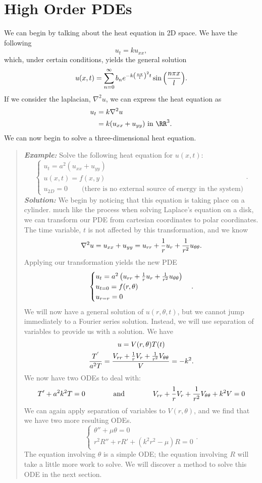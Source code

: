 \section{High Order PDEs}

We can begin by talking about the heat equation in 2D space. We have the following
\[
u_{t}=ku_{xx},
\]
which, under certain conditions, yields the general solution
\[
u(x,t) = \sum_{n=0}^{\infty}b_{n}e^{-k\left({n\pi\over l}\right)^{2}t}\sin{\left({n\pi x\over l}\right)}.
\]
If we consider the laplacian, $\nabla^{2}u$, we can express the heat equation as
\begin{align*}
u_{t}&=k\nabla^{2}u\\
&=k(u_{xx} + u_{yy})\text{ in }\RR^{3}.
\end{align*}
We can now begin to solve a three-dimensional heat equation.
\begin{quote}
\textbf{\textit{Example:}} Solve the following heat equation for $u(x,t)$:
\[
\begin{cases}
u_{t} = a^{2}(u_{xx} + u_{yy})\\
u(x,t) = f(x,y)\\
u_{2D} = 0\qquad\text{(there is no external source of energy in the system)}
\end{cases}.
\]
\textit{\textbf{Solution:}} We begin by noticing that this equation is taking place on a cylinder.
much like the process when solving Laplace's equation on a disk, we can transform our PDE from
cartesian coordinates to polar coordinates. The time variable, $t$ is not affected by this
transformation, and we know
\[
\nabla^{2} u=u_{xx} + u_{yy} = u_{rr} + {1\over r}u_{r} + {1\over r^{2}}u_{\theta\theta}.
\]
Applying our transformation yields the new PDE
\[
\begin{cases}
u_{t}=a^{2}\left(u_{rr} + {1\over r}u_{r} + {1\over r^{2}}u_{\theta\theta}\right)\\
u_{t=0}=f(r,\theta)\\
u_{r=r}=0
\end{cases}.
\]
We will now have a general solution of $u(r,\theta,t)$, but we cannot jump immediately to a Fourier
series solution. Instead, we will use separation of variables to provide us with a solution. We have
\begin{gather*}
u = V(r,\theta)T(t)\\
{T^{'}\over a^{2}T}= {V_{rr} + {1\over r}V_{r}+{1\over r^{2}}V_{\theta\theta}\over V} = -k^{2}.
\end{gather*}
We now have two ODEs to deal with:
\[
T'+a^{2}k^{2}T=0
\qquad\qquad\text{and}\qquad\qquad
V_{rr} + {1\over r}V_{r}+{1\over r^{2}}V_{\theta\theta}+k^{2}V=0
\]
We can again apply separation of variables to $V(r,\theta)$, and we find that we have two more resulting
ODEs.
\[
\begin{cases}
\theta''+\mu\theta=0\\
r^{2}R''+rR'+(k^{2}r^{2}-\mu)R=0
\end{cases}.
\]
The equation involving $\theta$ is a simple ODE; the equation involving $R$ will take a little more
work to solve. We will discover a method to solve this ODE in the next section.
\end{quote}

